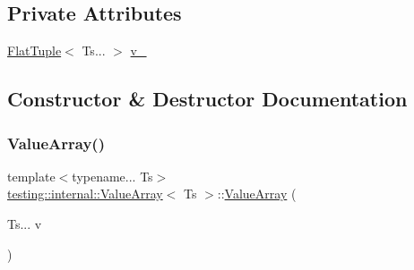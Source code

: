 \subsection*{Private Attributes}
\begin{DoxyCompactItemize}
\item 
\mbox{\hyperlink{classtesting_1_1internal_1_1_flat_tuple}{Flat\+Tuple}}$<$ Ts... $>$ \mbox{\hyperlink{classtesting_1_1internal_1_1_value_array_a98bb920948e1db4ad15cb443cfc84e7b}{v\+\_\+}}
\end{DoxyCompactItemize}


\subsection{Constructor \& Destructor Documentation}
\mbox{\label{classtesting_1_1internal_1_1_value_array_acd7cd6a969a7e95152eac1787c42c9ed}} 
\subsubsection{\texorpdfstring{ValueArray()}{ValueArray()}\hspace{0.1cm}{\footnotesize\ttfamily [1/2]}}
{\footnotesize\ttfamily template$<$typename... Ts$>$ \\
\mbox{\hyperlink{classtesting_1_1internal_1_1_value_array}{testing\+::internal\+::\+Value\+Array}}$<$ Ts $>$\+::\mbox{\hyperlink{classtesting_1_1internal_1_1_value_array}{Value\+Array}} (\begin{DoxyParamCaption}\item[{Ts...}]{v }\end{DoxyParamCaption})\hspace{0.3cm}{\ttfamily [inline]}}

\mbox{\label{classtesting_1_1internal_1_1_value_array_acd7cd6a969a7e95152eac1787c42c9ed}} 
